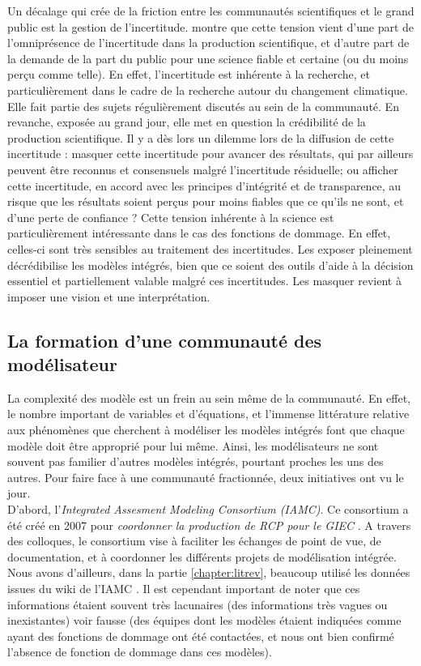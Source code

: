Un décalage qui crée de la friction entre les communautés scientifiques et le grand public est la gestion de l'incertitude. \cite{shackley_representing_1996} montre que cette tension vient d'une part de l'omniprésence de l'incertitude dans la production scientifique, et d'autre part de la demande de la part du public pour une science fiable et certaine (ou du moins perçu comme telle). En effet, l'incertitude est inhérente à la recherche, et particulièrement dans le cadre de la recherche autour du changement climatique. Elle fait partie des sujets régulièrement discutés au sein de la communauté. En revanche, exposée au grand jour, elle met en question la crédibilité de la production scientifique. Il y a dès lors un dilemme lors de la diffusion de cette incertitude : masquer cette incertitude pour avancer des résultats, qui par ailleurs peuvent être reconnus et consensuels malgré l'incertitude résiduelle; ou afficher cette incertitude, en accord avec les principes d'intégrité et de transparence, au risque que les résultats soient perçus pour moins fiables que ce qu'ils ne sont, et d'une perte de confiance ? 
Cette tension inhérente à la science est particulièrement intéressante dans le cas des fonctions de dommage. En effet, celles-ci sont très sensibles au traitement des incertitudes. Les exposer pleinement décrédibilise les modèles intégrés, bien que ce soient des outils d'aide à la décision essentiel et partiellement valable malgré ces incertitudes. Les masquer revient à imposer une vision et une interprétation. 



\subsection{La formation d'une communauté des modélisateur}

La complexité des modèle est un frein au sein même de la communauté. En effet, le nombre important de variables et d'équations, et l'immense littérature relative aux phénomènes que cherchent à modéliser les modèles intégrés font que chaque modèle doit être approprié pour lui même. Ainsi, les modélisateurs ne sont souvent pas familier d'autres modèles intégrés, pourtant proches les uns des autres. Pour faire face à une communauté fractionnée, deux initiatives ont vu le jour. \\

D'abord, l'\emph{Integrated Assesment Modeling Consortium (IAMC)}. Ce consortium a été créé en 2007 pour \emph{coordonner la production de RCP pour le GIEC} \cite{cointe_organising_2019}. A travers des colloques, le consortium vise à faciliter les échanges de point de vue, de documentation, et à coordonner les différents projets de modélisation intégrée. Nous avons d'ailleurs, dans la partie \ref{chapter:litrev}, beaucoup utilisé les données issues du wiki de l'IAMC \cite{noauthor_models_nodate}. Il est cependant important de noter que ces informations étaient souvent très lacunaires (des informations très vagues ou inexistantes) voir fausse (des équipes dont les modèles étaient indiquées comme ayant des fonctions de dommage ont été contactées, et nous ont bien confirmé l'absence de fonction de dommage dans ces modèles). \\


